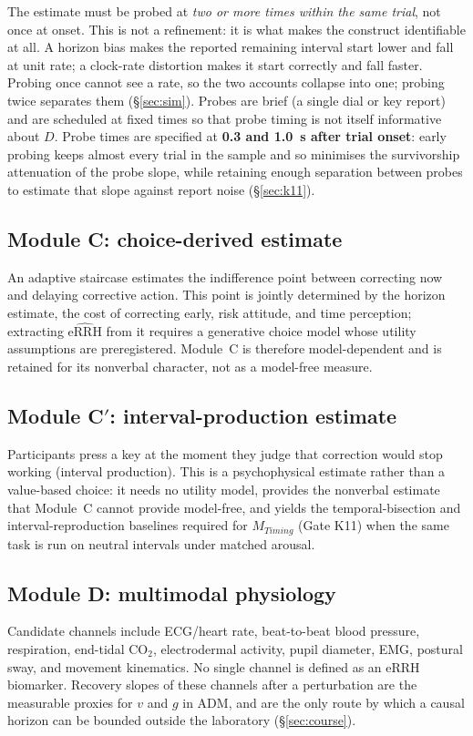 \documentclass[9pt,twocolumn]{article}
\newcommand{\eRRHhat}{\widehat{\mathrm{eRRH}}}
\begin{document}
The estimate must be probed at \emph{two or more times within the same trial}, not once at onset. This is not a refinement: it is what makes the construct identifiable at all. A horizon bias makes the reported remaining interval start lower and fall at unit rate; a clock-rate distortion makes it start correctly and fall faster. Probing once cannot see a rate, so the two accounts collapse into one; probing twice separates them (\S\ref{sec:sim}). Probes are brief (a single dial or key report) and are scheduled at fixed times so that probe timing is not itself informative about $D$. Probe times are specified at \textbf{0.3 and 1.0~s after trial onset}: early probing keeps almost every trial in the sample and so minimises the survivorship attenuation of the probe slope, while retaining enough separation between probes to estimate that slope against report noise (\S\ref{sec:k11}).

\subsection{Module C: choice-derived estimate}
An adaptive staircase estimates the indifference point between correcting now and delaying corrective action. This point is jointly determined by the horizon estimate, the cost of correcting early, risk attitude, and time perception; extracting $\eRRHhat$ from it requires a generative choice model whose utility assumptions are preregistered. Module~C is therefore model-dependent and is retained for its nonverbal character, not as a model-free measure.

\subsection{Module C$'$: interval-production estimate}
Participants press a key at the moment they judge that correction would stop working (interval production). This is a psychophysical estimate rather than a value-based choice: it needs no utility model, provides the nonverbal estimate that Module~C cannot provide model-free, and yields the temporal-bisection and interval-reproduction baselines required for $M_{Timing}$ (Gate K11) when the same task is run on neutral intervals under matched arousal.

\subsection{Module D: multimodal physiology}
Candidate channels include ECG/heart rate, beat-to-beat blood pressure, respiration, end-tidal CO$_2$, electrodermal activity, pupil diameter, EMG, postural sway, and movement kinematics. No single channel is defined as an eRRH biomarker. Recovery slopes of these channels after a perturbation are the measurable proxies for $v$ and $g$ in ADM, and are the only route by which a causal horizon can be bounded outside the laboratory (\S\ref{sec:course}).
\end{document}
